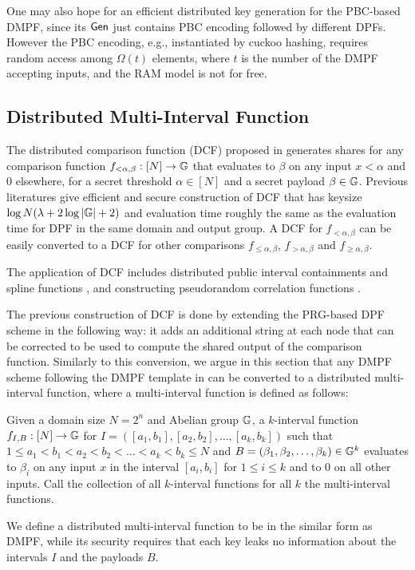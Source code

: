 \begin{remark}
    One may also hope for an efficient distributed key generation for the PBC-based DMPF, since its ${\sf Gen}$ just contains PBC encoding followed by different DPFs. However the PBC encoding, e.g., instantiated by cuckoo hashing, requires random access among $\Omega(t)$ elements, where $t$ is the number of the DMPF accepting inputs, and the RAM model is not for free. 
\end{remark}

\subsection{Distributed Multi-Interval Function}
The distributed comparison function (DCF) proposed in  generates shares for any comparison function $f_{<\alpha, \beta}:[N]\rightarrow \mathbb{G}$ that evaluates to $\beta$ on any input $x<\alpha$ and 0 elsewhere, for a secret threshold $\alpha\in[N]$ and a secret payload $\beta\in \mathbb{G}$. Previous literatures give efficient and secure construction of DCF that has keysize $\log N(\lambda+2\log |\mathbb{G}|+2)$ and evaluation time roughly the same as the evaluation time for DPF in the same domain and output group. A DCF for $f_{<\alpha, \beta}$ can be easily converted to a DCF for other comparisons $f_{\le \alpha, \beta}$, $f_{>\alpha,\beta}$ and $f_{\ge \alpha,\beta}$. 

The application of DCF includes distributed public interval containments and spline functions \cite{cryptoeprint:2020/1392,cryptoeprint:2019/1095}, and constructing pseudorandom correlation functions \cite{cryptoeprint:2022/1014}. 


The previous construction of DCF is done by extending the PRG-based DPF scheme in the following way: it adds an additional string at each node that can be corrected to be used to compute the shared output of the comparison function. Similarly to this conversion, we argue in this section that any DMPF scheme following the DMPF template in  can be converted to a distributed multi-interval function, where a multi-interval function is defined as follows: 
\begin{definition}
  Given a domain size $N=2^n$ and Abelian group $\mathbb{G}$, a $k$-interval function $f_{I,B}:[N]\rightarrow \mathbb{G}$ for $I = \left([a_1,b_1], [a_2,b_2], \dots, [a_k,b_k]\right)$ such that $1\le a_1<b_1<a_2<b_2<\dots<a_k<b_k\le N$ and $B = (\beta_1,\beta_2,\dots,\beta_k)\in \mathbb{G}^k$ evaluates to $\beta_i$ on any input $x$ in the interval $[a_i,b_i]$ for $1\le i\le k$ and to $0$ on all other inputs. Call the collection of all $k$-interval functions for all $k$ the multi-interval functions. 
\end{definition}
We define a distributed multi-interval function to be in the similar form as DMPF, while its security requires that each key leaks no information about the intervals $I$ and the payloads $B$. 

